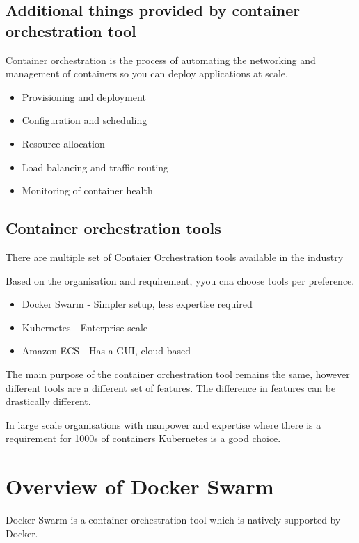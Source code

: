 \documentclass[11pt]{book}
\begin{document}
    \subsection{Additional things provided by container orchestration tool}
    Container orchestration is the process of automating the networking and management of containers so you can deploy applications at scale.
    \begin{itemize}
        \item Provisioning and deployment
        \item Configuration and scheduling
        \item Resource allocation
        \item Load balancing and traffic routing
        \item Monitoring of container health
    \end{itemize}

    \subsection{Container orchestration tools}
    There are multiple set of Contaier Orchestration tools available in the industry

    Based on the organisation and requirement, yyou cna choose tools per preference.

    \begin{itemize}
        \item Docker Swarm - Simpler setup, less expertise required
        \item Kubernetes - Enterprise scale
        \item Amazon ECS - Has a GUI, cloud based
    \end{itemize}

    The main purpose of the container orchestration tool remains the same, however different tools are a different set of features.
    The difference in features can be drastically different.

    In large scale organisations with manpower and expertise where there is a requirement for 1000s of containers Kubernetes is a good choice.

\section{Overview of Docker Swarm}
    Docker Swarm is a container orchestration tool which is natively supported by Docker.
\end{document}
